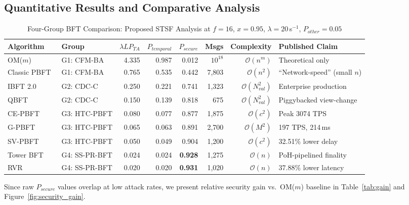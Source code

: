 \documentclass[10pt,twocolumn,letterpaper]{article}
\begin{document}
\subsection{Quantitative Results and Comparative Analysis}
\label{sec:results}

\begin{table}[t]
\caption{Four-Group BFT Comparison: Proposed STSF Analysis at $f = 16$, $x = 0.95$, $\lambda = 20$\,s$^{-1}$, $P_{other} = 0.05$}
\label{tab:comparison}
\centering
\scriptsize
\begin{tabular}{@{}llrrrrrp{3.2cm}@{}}
\toprule
\textbf{Algorithm} & \textbf{Group} & \textbf{$\lambda L P_{TA}$} & \textbf{$P_{temporal}$} & \textbf{$P_{secure}$} & \textbf{Msgs} & \textbf{Complexity} & \textbf{Published Claim} \\
\midrule
OM($m$)~\cite{lamport1982} & G1: CFM-BA & 4.335 & 0.987 & 0.012 & $10^{18}$ & $\mathcal{O}(n^m)$ & Theoretical only \\
Classic PBFT~\cite{castro1999} & G1: CFM-BA & 0.765 & 0.535 & 0.442 & 7,803 & $\mathcal{O}(n^2)$ & ``Network-speed'' (small $n$) \\
\midrule
IBFT 2.0 & G2: CDC-C & 0.250 & 0.221 & 0.741 & 1,323 & $\mathcal{O}(N_{val}^2)$ & Enterprise production \\
QBFT~\cite{li2020} & G2: CDC-C & 0.150 & 0.139 & 0.818 & 675 & $\mathcal{O}(N_{val}^2)$ & Piggybacked view-change \\
\midrule
CE-PBFT~\cite{ding2024} & G3: HTC-PBFT & 0.080 & 0.077 & 0.877 & 1,875 & $\mathcal{O}(c^2)$ & Peak 3074 TPS \\
G-PBFT~\cite{xu2025} & G3: HTC-PBFT & 0.065 & 0.063 & 0.891 & 2,700 & $\mathcal{O}(M^2)$ & 197 TPS, 214\,ms \\
SV-PBFT~\cite{suo2025} & G3: HTC-PBFT & 0.050 & 0.049 & 0.904 & 1,200 & $\mathcal{O}(c^2)$ & 32.51\% lower delay \\
\midrule
Tower BFT~\cite{yakovenko2018} & G4: SS-PR-BFT & 0.024 & 0.024 & \textbf{0.928} & 1,275 & $\mathcal{O}(n)$ & PoH-pipelined finality \\
RVR~\cite{wang2025} & G4: SS-PR-BFT & 0.020 & 0.020 & \textbf{0.931} & 1,020 & $\mathcal{O}(n)$ & 37.88\% lower latency \\
\bottomrule
\end{tabular}
\end{table}


Since raw $P_{secure}$ values overlap at low attack rates, we present relative security gain vs.\ OM($m$) baseline in Table~\ref{tab:gain} and Figure~\ref{fig:security_gain}. 
\end{document}
